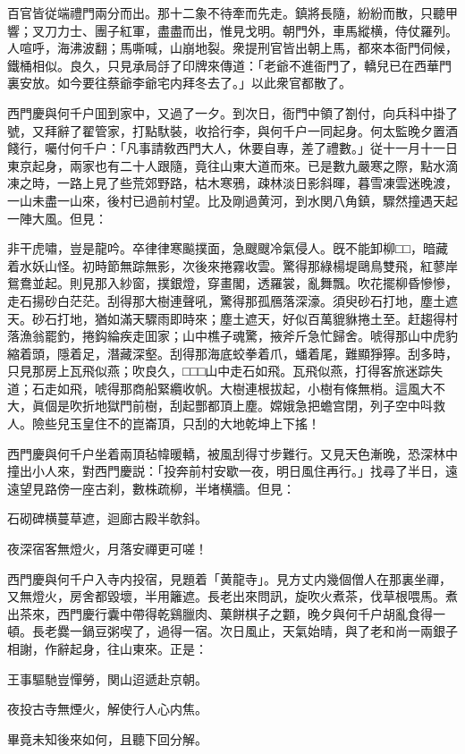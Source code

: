 百官皆従端禮門兩分而出。那十二象不待牽而先走。鎮將長隨，紛紛而散，只聽甲響；叉刀力士、團子紅軍，盡盡而出，惟見戈明。朝門外，車馬縱横，侍仗羅列。人喧呼，海沸波翻；馬嘶喊，山崩地裂。衆提刑官皆出朝上馬，都來本衙門伺候，鐵桶相似。良久，只見承局㧱了印牌來傳道：「老爺不進衙門了，轎兒已在西華門裏安放。如今要往蔡爺李爺宅内拜冬去了。」以此衆官都散了。

西門慶與何千户囬到家中，又過了一夕。到次日，衙門中領了劄付，向兵科中掛了號，又拜辭了翟管家，打點馱裝，收拾行李，與何千户一同起身。何太監晚夕置酒餞行，囑付何千户：「凡事請敎西門大人，休要自專，差了禮數。」従十一月十一日東京起身，兩家也有二十人跟隨，竟往山東大道而來。已是數九嚴寒之際，點水滴凍之時，一路上見了些荒郊野路，枯木寒鴉，疎林淡日影斜暉，暮雪凍雲迷晚渡，一山未盡一山來，後村已過前村望。比及剛過黄河，到水関八角鎮，驟然撞遇天起一陣大風。但見：

非干虎嘯，豈是龍吟。卒律律寒飈撲面，急颼颼冷氣侵人。旣不能卸柳□□，暗藏着水妖山怪。初時節無踪無影，次後來捲霧收雲。驚得那綠楊堤鷗鳥雙飛，紅蓼岸鴛鴦並起。則見那入紗窗，撲銀燈，穿畫閣，透羅裳，亂舞飄。吹花擺柳昏慘慘，走石揚砂白茫茫。刮得那大樹連聲吼，驚得那孤鴈落深濠。須臾砂石打地，塵土遮天。砂石打地，猶如滿天驟雨即時來；塵土遮天，好似百萬貔貅捲土至。赶趨得村落漁翁罷釣，捲鈎綸疾走囬家；山中樵子魂驚，掖斧斤急忙歸舍。唬得那山中虎豹縮着頭，隱着足，潛藏深壑。刮得那海底蛟拳着爪，蟠着尾，難顯猙獰。刮多時，只見那房上瓦飛似燕；吹良久，□□□山中走石如飛。瓦飛似燕，打得客旅迷踪失道；石走如飛，唬得那商船緊纜收帆。大樹連根拔起，小樹有條無梢。這風大不大，眞個是吹折地獄門前樹，刮起酆都頂上塵。嫦娥急把蟾宫閉，列子空中呌救人。險些兒玉皇住不的崑崙頂，只刮的大地乾坤上下搖！

西門慶與何千户坐着兩頂毡幃暖轎，被風刮得寸步難行。又見天色漸晚，恐深林中撞出小人來，對西門慶説：「投奔前村安歇一夜，明日風住再行。」找尋了半日，遠遠望見路傍一座古刹，數株疏柳，半堵横牆。但見：

石砌碑横蔓草遮，迴廊古殿半欹斜。

夜深宿客無燈火，月落安禪更可嗟！

西門慶與何千户入寺内投宿，見題着「黄龍寺」。見方丈内幾個僧人在那裏坐禪，又無燈火，房舍都毀壞，半用籬遮。長老出來問訊，旋吹火煮茶，伐草根喂馬。煮出茶來，西門慶行囊中帶得乾鷄臘肉、菓餅棋子之䫫，晚夕與何千户胡亂食得一頓。長老爨一鍋豆粥喫了，過得一宿。次日風止，天氣始晴，與了老和尚一兩銀子相謝，作辭起身，往山東來。正是：

王事驅馳豈憚勞，関山迢遞赴京朝。

夜投古寺無煙火，解使行人心内焦。

畢竟未知後來如何，且聽下回分解。

